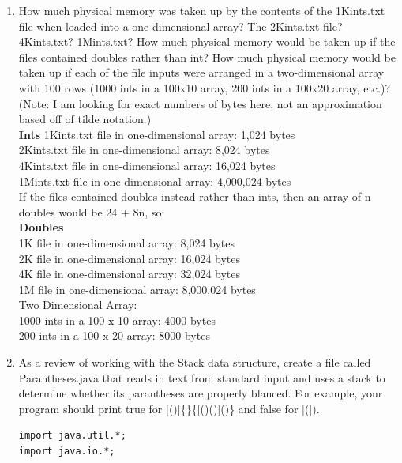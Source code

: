 \documentclass{article}
\begin{document}
\begin{enumerate}
\begin{lstlisting}
\item What does the following recursive function return
\begin{lstlisting}
public static String mystery(String s){
	if (s.length() <= 1) {
		return s;
	}else {
		String a = a.subString(0, s.length()/2);
		String b = b.subString(s.length()/2, s.length());
		return mystery(b) + mystery(a);
	}//if-else
}//mystery
\end{lstlisting}
This recursive function will return a string in reverse order.
\item How much physical memory was taken up by the contents of the 1Kints.txt file when loaded into a one-dimensional array? The 2Kints.txt file? 4Kints.txt? 1Mints.txt? How much physical memory would be taken up if the files contained doubles rather than int? How much physical memory would be taken up if each of the file inputs were arranged in a two-dimensional array with 100 rows (1000 ints in a 100x10 array, 200 ints in a 100x20 array, etc.)? (Note: I am looking for exact numbers of bytes here, not an approximation based off of tilde notation.)
\\
\textbf{Ints}
1Kints.txt file in one-dimensional array: 1,024 bytes
\\
2Kints.txt file in one-dimensional array: 8,024 bytes
\\
4Kints.txt file in one-dimensional array: 16,024 bytes
\\
1Mints.txt file in one-dimensional array: 4,000,024 bytes
\\
If the files contained doubles instead rather than ints, then an array of n doubles would be 24 + 8n, so:
\\
\textbf{Doubles}
\\
1K file in one-dimensional array: 8,024 bytes
\\
2K file in one-dimensional array: 16,024 bytes
\\
4K file in one-dimensional array: 32,024 bytes
\\
1M file in one-dimensional array: 8,000,024 bytes
\\
Two Dimensional Array: 
\\
1000 ints in a 100 x 10 array: 4000 bytes
\\
200 ints in a 100 x 20 array: 8000 bytes
\item As a review of working with the Stack data structure, create a file called Parantheses.java that reads in text from standard input and uses a stack to determine whether its parantheses are properly blanced. For example, your program should print true for [()]\{\}\{[()()]()\} and false for [(]).
\begin{lstlisting}
import java.util.*;
import java.io.*;



\end{lstlisting}
\end{enumerate}
\end{document}
